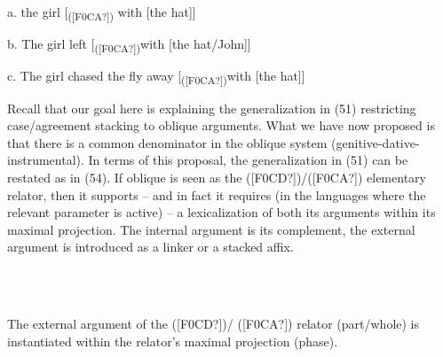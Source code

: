 \documentclass[output=paper]{langsci/langscibook}
\begin{document}
\begin{styleSfondomedioiColorexi}
\ea%
    \label{ex:key:53}
    \gll\\
        \\
    \glt
    \z

           a.  the girl [\textsubscript{([F0CA?])} with [the hat]]
\end{styleSfondomedioiColorexi}

\begin{styleSfondomedioiColorexi}
  b.  The girl left [\textsubscript{([F0CA?])}with [the hat/John]]
\end{styleSfondomedioiColorexi}

\begin{styleSfondomedioiColorexi}
  c.  The girl chased the fly away [\textsubscript{([F0CA?])}with [the hat]]
\end{styleSfondomedioiColorexi}

\begin{styleSfondomedioiColorexi}
  Recall that our goal here is explaining the generalization in (51) restricting case/agreement stacking to oblique arguments. What we have now proposed is that there is a common denominator in the oblique system (genitive-dative-instrumental). In terms of this proposal, the generalization in (51) can be restated as in (54). If oblique is seen as the ([F0CD?])/([F0CA?]) elementary relator, then it supports – and in fact it requires (in the languages where the relevant parameter is active) – a lexicalization of both its arguments within its maximal projection. The internal argument is its complement, the external argument is introduced as a linker or a stacked affix.
\end{styleSfondomedioiColorexi}

\ea%
    \label{ex:key:54}
    \gll\\
        \\
    \glt
    \z

          The external argument of the ([F0CD?])/ ([F0CA?]) relator (part/whole) is instantiated within the relator’s maximal projection (phase).
\end{document}
